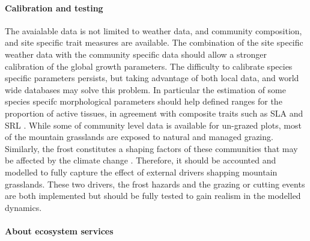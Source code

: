 \paragraph{Calibration and testing}

The avaialable data is not limited to weather data, and community composition, and site specific trait measures are available. The combination of the site specific weather data with the community specific data should allow a stronger calibration of the global growth parameters. The difficulty to calibrate species specific parameters persists, but taking advantage of both local data, and world wide databases may solve this problem. In particular the estimation of some species specifc morphological parameters should help defined ranges for the proportion of active tissues, in agreement with composite traits such as SLA \parencite{john_anatomical_2017} and SRL \parencite{roumet_root_2016}. While some of community level data is available for un-grazed plots, most of the mountain grasslands are exposed to natural and managed grazing. Similarly, the frost constitutes a shaping factors of these communities that may be affected by the climate change \parencite{choler_growth_2015}. Therefore, it should be accounted and modelled to fully capture the effect of external drivers shapping mountain grasslands. These two drivers, the frost hazards and the grazing or cutting events are both implemented but should be fully tested to gain realism in the modelled dynamics.

%
%
%
%
%

\paragraph{About ecosystem services}


